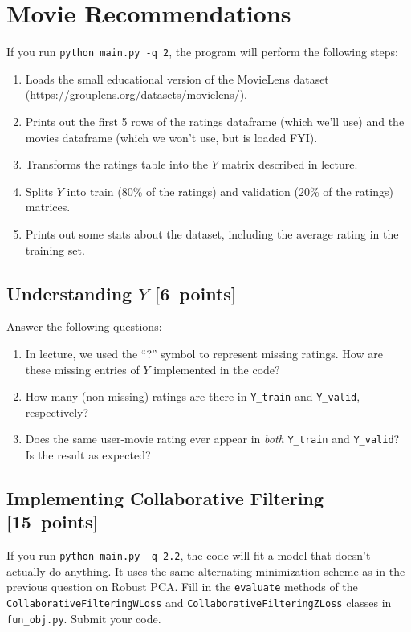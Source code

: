 \documentclass{article}
\newcommand{\blu}[1]{{\textcolor{blu}{#1}}}
\let\ask\blu
\newcommand\pts[1]{\textcolor{pointscolour}{[#1~points]}}
\begin{document}
\section{Movie Recommendations}

If you run \texttt{python main.py -q 2}, the program will perform the following steps:

\begin{enumerate}
\item Loads the small educational version of the MovieLens dataset (\url{https://grouplens.org/datasets/movielens/}).
\item Prints out the first 5 rows of the ratings dataframe (which we'll use) and the movies dataframe (which we won't use, but is loaded FYI).
\item Transforms the ratings table into the $Y$ matrix described in lecture.
\item Splits $Y$ into train (80\% of the ratings) and validation (20\% of the ratings) matrices.
\item Prints out some stats about the dataset, including the average rating in the training set.
\end{enumerate}

\subsection{Understanding $Y$ \pts{6}}

\ask{Answer the following questions:}

\begin{enumerate}
\item In lecture, we used the ``?'' symbol to represent missing ratings. How are these missing entries of $Y$ implemented in the code?
\item How many (non-missing) ratings are there in \texttt{Y\_train} and \texttt{Y\_valid}, respectively?
\item Does the same user-movie rating ever appear in \emph{both} \texttt{Y\_train} and \texttt{Y\_valid}? Is the result as expected?
\end{enumerate}


\subsection{Implementing Collaborative Filtering \pts{15}}

If you run \texttt{python main.py -q 2.2}, the code will fit a model that doesn't actually do anything. It uses the same alternating minimization scheme as in the previous question on Robust PCA. \ask{Fill in the \texttt{evaluate} methods of the \texttt{CollaborativeFilteringWLoss} and \texttt{CollaborativeFilteringZLoss} classes in \texttt{fun\_obj.py}. Submit your code.}
\end{document}
